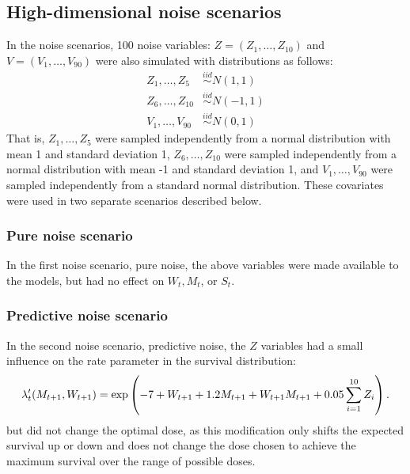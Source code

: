 \documentclass[12pt]{article}
\begin{document}

\subsection{High-dimensional noise scenarios} %
\label{sub:noise_variables}

In the noise scenarios, 100 noise variables: $Z = (Z_{1}, \ldots, Z_{10})$ and $V = (V_{1}, \ldots, V_{90})$ were also simulated with distributions as follows:
\begin{align}
  Z_{1}, \ldots, Z_{5} &\overset{iid}{\sim} N(1, 1) \\
  Z_{6}, \ldots, Z_{10} &\overset{iid}{\sim} N(-1, 1) \\
  V_{1}, \ldots, V_{90} &\overset{iid}{\sim} N(0, 1)
\end{align}
That is, $Z_{1}, \ldots, Z_{5}$ were sampled independently from a normal distribution with mean 1 and standard deviation 1, $Z_{6}, \ldots, Z_{10}$ were sampled independently from a normal distribution with mean -1 and standard deviation 1, and $V_{1}, \ldots, V_{90}$ were sampled independently from a standard normal distribution. These covariates were used in two separate scenarios described below.

\subsubsection{Pure noise scenario} %
\label{ssub:pure_noise}

In the first noise scenario, pure noise, the above variables were made available to the models, but had no effect on $W_{t}, M_{t}$, or $S_{t}$.


\subsubsection{Predictive noise scenario} %
\label{ssub:predictive_noise}
In the second noise scenario, predictive noise, the $Z$ variables had a small influence on the rate parameter in the survival distribution:
\begin{equation}
  \lambda'_{t}(M_{t+1}, W_{t+1}) = \exp\del{-7 + W_{t+1} + 1.2 M_{t+1} + W_{t+1} M_{t+1} + 0.05 \sum_{i = 1}^{10} Z_{i}}.
\end{equation}
but did not change the optimal dose, as this modification only shifts the expected survival up or down and does not change the dose chosen to achieve the maximum survival over the range of possible doses.
\end{document}
